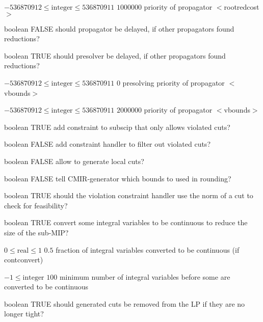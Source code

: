 %
{$-536870912\leq\textrm{integer}\leq536870911$}%
{$1000000$}%
{priority of propagator $<$rootredcost$>$}%
{}

%
{boolean}%
{FALSE}%
{should propagator be delayed, if other propagators found reductions?}%
{}

%
{boolean}%
{TRUE}%
{should presolver be delayed, if other propagators found reductions?}%
{}

%
{$-536870912\leq\textrm{integer}\leq536870911$}%
{$0$}%
{presolving priority of propagator $<$vbounds$>$}%
{}

%
{$-536870912\leq\textrm{integer}\leq536870911$}%
{$2000000$}%
{priority of propagator $<$vbounds$>$}%
{}

%
{boolean}%
{TRUE}%
{add constraint to subscip that only allows violated cuts?}%
{}

%
{boolean}%
{FALSE}%
{add constraint handler to filter out violated cuts?}%
{}

%
{boolean}%
{FALSE}%
{allow to generate local cuts?}%
{}

%
{boolean}%
{FALSE}%
{tell CMIR-generator which bounds to used in rounding?}%
{}

%
{boolean}%
{TRUE}%
{should the violation constraint handler use the norm of a cut to check for feasibility?}%
{}

%
{boolean}%
{TRUE}%
{convert some integral variables to be continuous to reduce the size of the sub-MIP?}%
{}

%
{$0\leq\textrm{real}\leq1$}%
{$0.5$}%
{fraction of integral variables converted to be continuous (if contconvert)}%
{}

%
{$-1\leq\textrm{integer}$}%
{$100$}%
{minimum number of integral variables before some are converted to be continuous}%
{}

%
{boolean}%
{TRUE}%
{should generated cuts be removed from the LP if they are no longer tight?}%
{}


